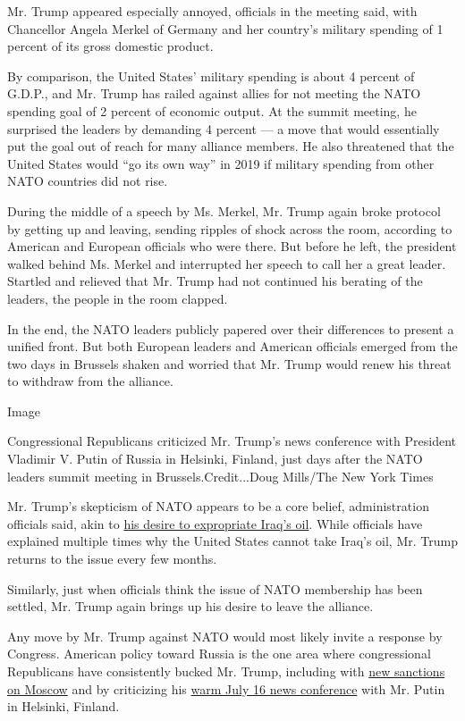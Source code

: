 Mr. Trump appeared especially annoyed, officials in the meeting said,
with Chancellor Angela Merkel of Germany and her country's military
spending of 1 percent of its gross domestic product.

By comparison, the United States' military spending is about 4 percent
of G.D.P., and Mr. Trump has railed against allies for not meeting the
NATO spending goal of 2 percent of economic output. At the summit
meeting, he surprised the leaders by demanding 4 percent --- a move that
would essentially put the goal out of reach for many alliance members.
He also threatened that the United States would ``go its own way'' in
2019 if military spending from other NATO countries did not rise.

During the middle of a speech by Ms. Merkel, Mr. Trump again broke
protocol by getting up and leaving, sending ripples of shock across the
room, according to American and European officials who were there. But
before he left, the president walked behind Ms. Merkel and interrupted
her speech to call her a great leader. Startled and relieved that Mr.
Trump had not continued his berating of the leaders, the people in the
room clapped.

In the end, the NATO leaders publicly papered over their differences to
present a unified front. But both European leaders and American
officials emerged from the two days in Brussels shaken and worried that
Mr. Trump would renew his threat to withdraw from the alliance.

Image

Congressional Republicans criticized Mr. Trump's news conference with
President Vladimir V. Putin of Russia in Helsinki, Finland, just days
after the NATO leaders summit meeting in Brussels.Credit...Doug
Mills/The New York Times

Mr. Trump's skepticism of NATO appears to be a core belief,
administration officials said, akin to
\href{https://www.nytimes.com/2017/02/20/world/middleeast/jim-mattis-iraq-oil-trump.html}{his
desire to expropriate Iraq's oil}. While officials have explained
multiple times why the United States cannot take Iraq's oil, Mr. Trump
returns to the issue every few months.

Similarly, just when officials think the issue of NATO membership has
been settled, Mr. Trump again brings up his desire to leave the
alliance.

Any move by Mr. Trump against NATO would most likely invite a response
by Congress. American policy toward Russia is the one area where
congressional Republicans have consistently bucked Mr. Trump, including
with
\href{https://www.nytimes.com/2018/08/09/world/europe/russia-sanctions-ruble.html}{new
sanctions on Moscow} and by criticizing his
\href{https://www.nytimes.com/2018/07/16/world/europe/trump-putin-election-intelligence.html}{warm
July 16 news conference} with Mr. Putin in Helsinki, Finland.

